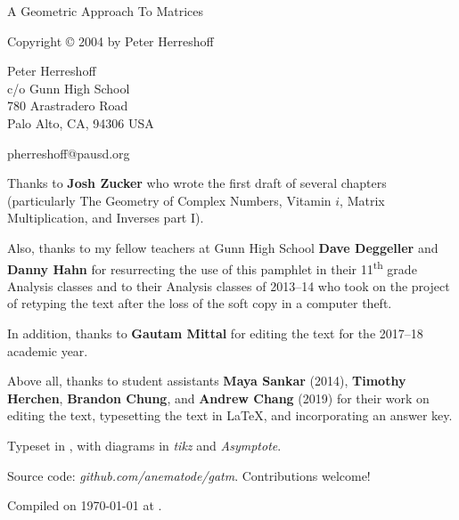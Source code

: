 \documentclass[../gatm.tex]{subfiles}
\begin{document}
\newcommand\dnew{\vspace{1cm}}

\begin{center}
	\vspace*{\fill}

	\doublespacing
	A Geometric Approach To Matrices

	Copyright \copyright{} 2004 by Peter Herreshoff  %

	\vspace{1cm}

	Peter Herreshoff\\
	c/o Gunn High School\\
	780 Arastradero Road\\
	Palo Alto, CA, 94306 USA

	\vspace{.5cm}

	pherreshoff@pausd.org

	\vspace{1cm}
\end{center}

\noindent Thanks to \textbf{Josh Zucker} who wrote the first draft of several chapters (particularly The Geometry of Complex Numbers, Vitamin $i$, Matrix Multiplication, and Inverses part I).

Also, thanks to my fellow teachers at Gunn High School \textbf{Dave Deggeller} and \textbf{Danny Hahn} for resurrecting the use of this pamphlet in their 11\textsuperscript{th} grade Analysis classes and to their Analysis classes of 2013--14 who took on the project of retyping the text after the loss of the soft copy in a computer theft.

In addition, thanks to \textbf{Gautam Mittal} for editing the text for the 2017--18 academic year.

Above all, thanks to student assistants \textbf{Maya Sankar} (2014), \textbf{Timothy Herchen}, \textbf{Brandon Chung}, and \textbf{Andrew Chang} (2019) for their work on editing the text, typesetting the text in \LaTeX{}, and incorporating an answer key.

\vspace{0.5cm}

Typeset in \LaTeXe, with diagrams in \textit{tikz} and \textit{Asymptote}.

Source code: \textit{github.com/anematode/gatm}. Contributions welcome!

Compiled on {\ddmmyyyydate\today} at \currenttime.

\vspace*{\fill}
\end{document}
